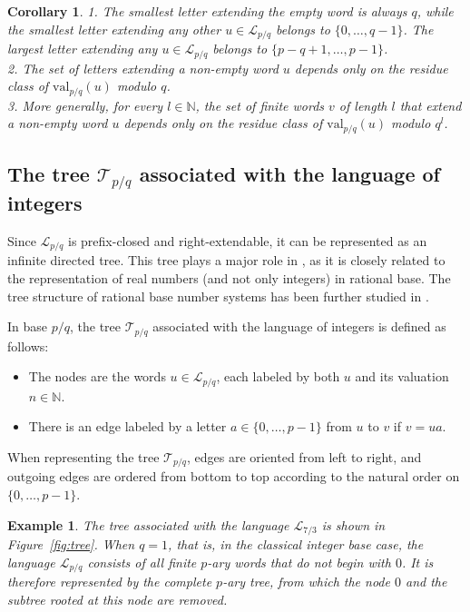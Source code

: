\documentclass{template_arxiv}
\newtheorem{corollary}[theorem]{Corollary}
\newtheorem{example}[theorem]{Example}
\numberwithin{equation}{section}
\newcommand{\N}{\mathbb N}
\newcommand{\lan}{\mathcal{L}}
\newcommand{\val}{\mathrm{val}}
\newcommand{\tree}{\mathcal{T}} %
\begin{document}
\begin{corollary}\label{cor:csq_MDalgo}
	1. The smallest letter extending the empty word is always $q$, while the smallest letter extending any other  $u  \in \lan_{p/q}$ belongs to $\{0,\ldots,q-1\}$. The largest letter extending any $u  \in \lan_{p/q}$ belongs to $\{p-q+1,\ldots,p-1\}$. \\
	2. The set of letters extending a non-empty word $u$  depends only on the residue class of $\mathrm{val}_{p/q}(u)$ modulo $q$.\\
3. More generally, for every $l \in\N$, the set of finite words $v$ of length $l$ that extend a non-empty word $u$ depends only on the residue class of $\val_{p/q}(u)$ modulo $q^l$.\end{corollary}


\subsection{The tree $\tree_{p/q}$ associated with the language of integers }


Since $\lan_{p/q}$ is prefix-closed and right-extendable, it can be represented as an infinite directed tree. This tree plays a major role in \cite{AFS08}, as it is closely related to the representation of real numbers (and not only integers) in rational base. The tree structure of rational base number systems has been further studied in \cite{MS17,AMS18}.
\medskip

In base $p/q$, the tree $\tree_{p/q}$ associated with the language of integers is defined as follows:
\begin{itemize}
	\item The nodes are the words $u \in \lan_{p/q}$, each labeled by both $u$ and its valuation $n \in \mathbb{N}$.
	\item There is an edge labeled by a letter $a \in \{0, \dots, p-1\}$ from $u$ to $v$ if $v = ua$.
\end{itemize}
When representing the tree $\tree_{p/q}$, edges are oriented from left to right, and outgoing edges are ordered from bottom to top according to the natural order on $\{0, \dots, p-1\}$.


\begin{example} The tree associated with the language $\lan_{7/3}$ is shown in Figure~\ref{fig:tree}. When $q = 1$, that is, in the classical integer base case, the language $\lan_{p/q}$ consists of all finite $p$-ary words that do not begin with $0$. It is therefore represented by the complete $p$-ary tree, from which  the node $0$ and the subtree rooted at this node are removed.
\end{example}
\end{document}
